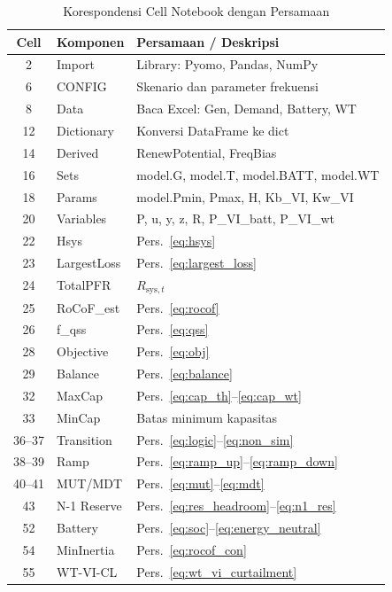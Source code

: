 \documentclass[journal]{IEEEtran}
\begin{document}
\begin{table}[!t]\renewcommand{\arraystretch}{1.2}
\caption{Korespondensi Cell Notebook dengan Persamaan}
\label{tab:cell_map}
\centering\footnotesize
\begin{tabular}{clp{4.8cm}}
\toprule
Cell & Komponen & Persamaan / Deskripsi \\
\midrule
2  & Import       & Library: Pyomo, Pandas, NumPy \\
6  & CONFIG       & Skenario dan parameter frekuensi \\
8  & Data         & Baca Excel: Gen, Demand, Battery, WT \\
12 & Dictionary   & Konversi DataFrame ke dict \\
14 & Derived      & RenewPotential, FreqBias \\
16 & Sets         & model.G, model.T, model.BATT, model.WT \\
18 & Params       & model.Pmin, Pmax, H, Kb\_VI, Kw\_VI \\
20 & Variables    & P, u, y, z, R, P\_VI\_batt, P\_VI\_wt \\
22 & Hsys         & Pers.~\eqref{eq:hsys} \\
23 & LargestLoss  & Pers.~\eqref{eq:largest_loss} \\
24 & TotalPFR     & $R_{\mathrm{sys},t}$ \\
25 & RoCoF\_est   & Pers.~\eqref{eq:rocof} \\
26 & f\_qss       & Pers.~\eqref{eq:qss} \\
28 & Objective    & Pers.~\eqref{eq:obj} \\
29 & Balance      & Pers.~\eqref{eq:balance} \\
32 & MaxCap       & Pers.~\eqref{eq:cap_th}--\eqref{eq:cap_wt} \\
33 & MinCap       & Batas minimum kapasitas \\
36--37 & Transition & Pers.~\eqref{eq:logic}--\eqref{eq:non_sim} \\
38--39 & Ramp      & Pers.~\eqref{eq:ramp_up}--\eqref{eq:ramp_down} \\
40--41 & MUT/MDT   & Pers.~\eqref{eq:mut}--\eqref{eq:mdt} \\
43 & N-1 Reserve  & Pers.~\eqref{eq:res_headroom}--\eqref{eq:n1_res} \\
52 & Battery      & Pers.~\eqref{eq:soc}--\eqref{eq:energy_neutral} \\
54 & MinInertia   & Pers.~\eqref{eq:rocof_con} \\
55 & WT-VI-CL     & Pers.~\eqref{eq:wt_vi_curtailment} \\

\end{tabular}
\end{table}
\end{document}
